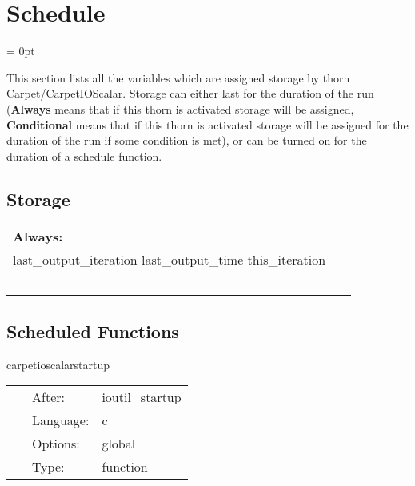 
\section{Schedule} 


\parskip = 0pt


\noindent This section lists all the variables which are assigned storage by thorn Carpet/CarpetIOScalar.  Storage can either last for the duration of the run ({\bf Always} means that if this thorn is activated storage will be assigned, {\bf Conditional} means that if this thorn is activated storage will be assigned for the duration of the run if some condition is met), or can be turned on for the duration of a schedule function.


\subsection*{Storage}

\hspace{5mm}

 \begin{tabular*}{160mm}{ll} 

{\bf Always:}&  ~ \\ 
 last\_output\_iteration last\_output\_time this\_iteration & ~\\ 
~ & ~\\ 
\end{tabular*} 


\subsection*{Scheduled Functions}
\vspace{5mm}


\hspace{5mm} carpetioscalarstartup 

\hspace{5mm}{\it startup routine } 


\hspace{5mm}

 \begin{tabular*}{160mm}{cll} 
~ & After:  & ioutil\_startup \\ 
~ & Language:  & c \\ 
~ & Options:  & global \\ 
~ & Type:  & function \\ 
\end{tabular*} 


